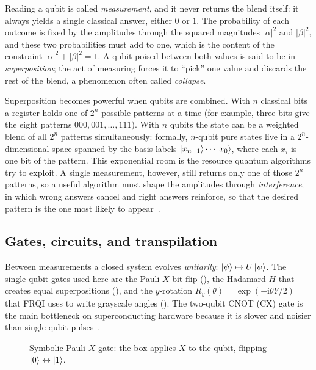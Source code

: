 Reading a qubit is called \emph{measurement}, and it never returns the blend itself: it always yields a single classical answer, either $0$ or $1$. The probability of each outcome is fixed by the amplitudes through the squared magnitudes $|\alpha|^2$ and $|\beta|^2$, and these two probabilities must add to one, which is the content of the constraint $|\alpha|^2 + |\beta|^2 = 1$. A qubit poised between both values is said to be in \emph{superposition}; the act of measuring forces it to ``pick'' one value and discards the rest of the blend, a phenomenon often called \emph{collapse}.

Superposition becomes powerful when qubits are combined. With $n$ classical bits a register holds one of $2^n$ possible patterns at a time (for example, three bits give the eight patterns $000,001,\dots,111$). With $n$ qubits the state can be a weighted blend of all $2^n$ patterns simultaneously: formally, $n$-qubit pure states live in a $2^n$-dimensional space spanned by the basis labels $\ket{x_{n-1}}\cdots\ket{x_0}$, where each $x_i$ is one bit of the pattern. This exponential room is the resource quantum algorithms try to exploit. A single measurement, however, still returns only one of those $2^n$ patterns, so a useful algorithm must shape the amplitudes through \emph{interference}, in which wrong answers cancel and right answers reinforce, so that the desired pattern is the one most likely to appear~\cite{NielsenChuang2010}.

\subsection{Gates, circuits, and transpilation}
Between measurements a closed system evolves \emph{unitarily}: $\ket{\psi}\mapsto U\ket{\psi}$. The single-qubit gates used here are the Pauli-$X$ bit-flip (), the Hadamard $H$ that creates equal superpositions (), and the $y$-rotation $R_y(\theta)=\exp(-\mathrm{i}\theta Y/2)$ that FRQI uses to write grayscale angles (). The two-qubit CNOT (CX) gate is the main bottleneck on superconducting hardware because it is slower and noisier than single-qubit pulses~\cite{Geng2023ImprovedFRQI}.

\begin{figure}[htbp]
\centering
{}
\caption{Symbolic Pauli-$X$ gate: the box applies $X$ to the qubit, flipping $\ket{0}\leftrightarrow\ket{1}$.}
\label{fig:tikz-paulix}
\end{figure}

